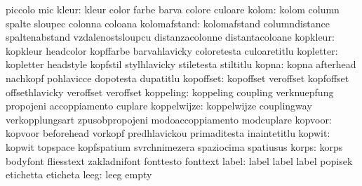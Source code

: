                            piccolo                   mic
                    kleur: kleur                     color
                           farbe                     barva
                           colore                    culoare
                    kolom: kolom                     column
                           spalte                    sloupec
                           colonna                   coloana
             kolomafstand: kolomafstand              columndistance
                           spaltenabstand            vzdalenostsloupcu
                           distanzacolonne           distantacoloane
                 kopkleur: kopkleur                  headcolor
                           kopffarbe                 barvahlavicky
                           coloretesta               culoaretitlu
                kopletter: kopletter                 headstyle
                           kopfstil                  stylhlavicky
                           stiletesta                stiltitlu
                    kopna: kopna                     afterhead
                           nachkopf                  pohlavicce
                           dopotesta                 dupatitlu
                kopoffset: kopoffset                 veroffset
                           kopfoffset                offsethlavicky
                           veroffset                 veroffset %
                koppeling: koppeling                 coupling
                           verknuepfung              propojeni
                           accoppiamento             cuplare
              koppelwijze: koppelwijze               couplingway
                           verkopplungsart           zpusobpropojeni
                           modoaccoppiamento         modcuplare
                  kopvoor: kopvoor                   beforehead
                           vorkopf                   predhlavickou
                           primaditesta              inaintetitlu
                   kopwit: kopwit                    topspace
                           kopfspatium               svrchnimezera
                           spaziocima                spatiusus
                    korps: korps                     bodyfont
                           fliesstext                zakladnifont
                           fonttesto                 fonttext
                    label: label                     label
                           label                     popisek
                           etichetta                 eticheta
                     leeg: leeg                      empty
